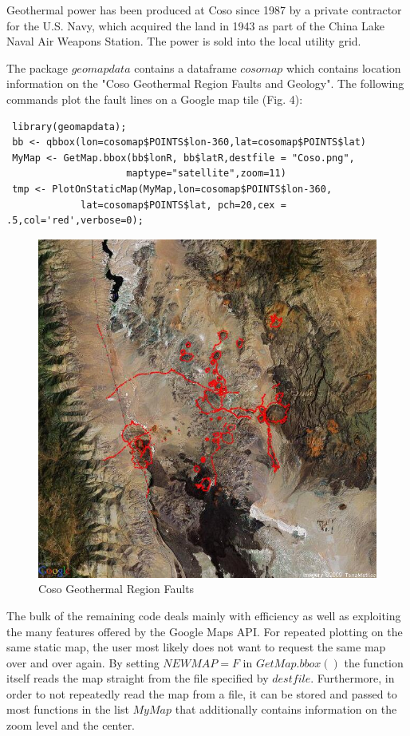 \documentclass{article}
\begin{document}
\noindent Geothermal power has been produced at Coso since 1987 by a private contractor for the U.S. Navy, which acquired the land in 1943 as part of the China Lake Naval Air Weapons Station. The power is sold into the local utility grid.

\noindent The package $geomapdata$ contains a dataframe $cosomap$ which contains location information on the "Coso Geothermal Region Faults and Geology".
The following commands plot the fault lines on a Google map tile (Fig. 4):
\begin{verbatim}
 library(geomapdata);
 bb <- qbbox(lon=cosomap$POINTS$lon-360,lat=cosomap$POINTS$lat)
 MyMap <- GetMap.bbox(bb$lonR, bb$latR,destfile = "Coso.png", 
                     maptype="satellite",zoom=11)
 tmp <- PlotOnStaticMap(MyMap,lon=cosomap$POINTS$lon-360,
             lat=cosomap$POINTS$lat, pch=20,cex = .5,col='red',verbose=0);
\end{verbatim}

\begin{figure}[thb]
\centering
   \includegraphics[width = .975 \textwidth]{Coso.jpg}
    \caption{Coso Geothermal Region Faults}
\end{figure}


\noindent The bulk of the remaining code deals mainly with efficiency as well as exploiting the many features offered by the Google Maps API.
For repeated plotting on the same static map, the user most likely does not want to request the same map over and over again. 
By setting $NEWMAP = F$ in $GetMap.bbox()$ the function itself reads the map straight from the file specified by $destfile$.
Furthermore, in order to not repeatedly read the map from a file, it can be stored and passed to most functions in the list $MyMap$ that additionally contains information on the zoom level and the center.
\end{document}
